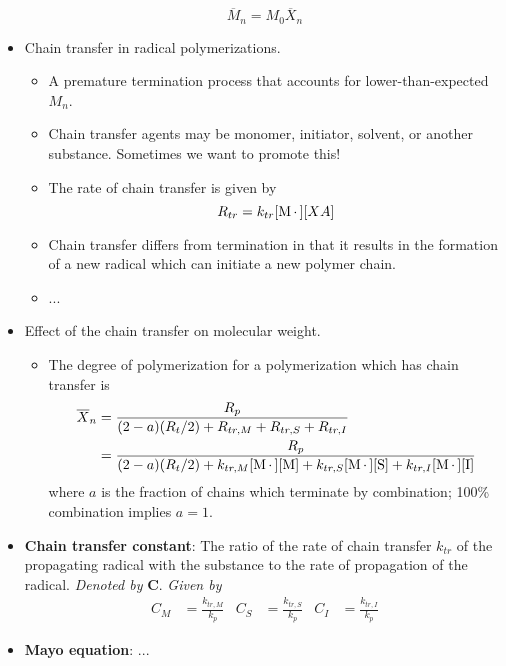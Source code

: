 \documentclass[../notes.tex]{subfiles}
\begin{document}
\begin{itemize}
    \begin{equation*}
        \overline{M}_n = M_0\overline{X}_n
    \end{equation*}
    \item Chain transfer in radical polymerizations.
    \begin{itemize}
        \item A premature termination process that accounts for lower-than-expected $M_n$.
        \item Chain transfer agents may be monomer, initiator, solvent, or another substance. Sometimes we want to promote this!
        \item The rate of chain transfer is given by
        \begin{equation*}
            R_{tr} = k_{tr}[\ce{M*}][XA]
        \end{equation*}
        \item Chain transfer differs from termination in that it results in the formation of a new radical which can initiate a new polymer chain.
        \item ...
    \end{itemize}
    \item Effect of the chain transfer on molecular weight.
    \begin{itemize}
        \item The degree of polymerization for a polymerization which has chain transfer is
        \begin{align*}
            \overline{X}_n &= \frac{R_p}{(2-a)(R_t/2)+R_{tr,M}+R_{tr,S}+R_{tr,I}}\\
            &= \frac{R_p}{(2-a)(R_t/2)+k_{tr,M}[\ce{M*}][\ce{M}]+k_{tr,S}[\ce{M*}][\ce{S}]+k_{tr,I}[\ce{M*}][\ce{I}]}
        \end{align*}
        where $a$ is the fraction of chains which terminate by combination; 100\% combination implies $a=1$.
    \end{itemize}
    \item \textbf{Chain transfer constant}: The ratio of the rate of chain transfer $k_{tr}$ of the propagating radical with the substance to the rate of propagation of the radical. \emph{Denoted by} $\bm{C}$. \emph{Given by}
    \begin{align*}
        C_M &= \frac{k_{tr,M}}{k_p}&
        C_S &= \frac{k_{tr,S}}{k_p}&
        C_I &= \frac{k_{tr,I}}{k_p}
    \end{align*}
    \item \textbf{Mayo equation}: ...
    \begin{itemize}

\end{itemize}
\end{itemize}
\end{document}
